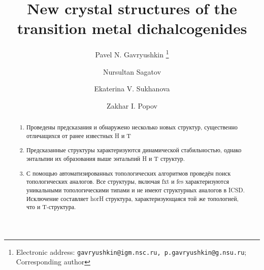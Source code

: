 \documentclass[a4paperm]{article}
\begin{document}

\title{New crystal structures of the transition metal dichalcogenides}


\author[1,2]{Pavel N. Gavryushkin
   \thanks{Electronic address: \texttt{gavryushkin@igm.nsc.ru, p.gavryushkin@g.nsu.ru}; Corresponding author}}     
\author[1]{Nursultan Sagatov}
\author[3]{Ekaterina V. Sukhanova}
\author[3]{Zakhar I. Popov}



\date{}
\maketitle


\begin{abstract}
\begin{enumerate}
	\item Проведены предсказания и обнаружено несколько новых структур, существенно отличащихся от ранее известных H и T 
	\item Предсказанные структуры характеризуются динамической стабильностью, однако энтальпии их образования выше энтальпий H и T структур.
	 \item С помощью автоматизированных топологических алгоритмов проведён поиск топологических аналогов. Все структуры, включая fxt и fes характеризуются уникальными топологическими типами и не имеют структурных аналогов в ICSD. Исключение составляет horH структура, характеризующаяся той же топологией, что и T-структура. 
\end{enumerate}
\end{abstract}

\end{document}
